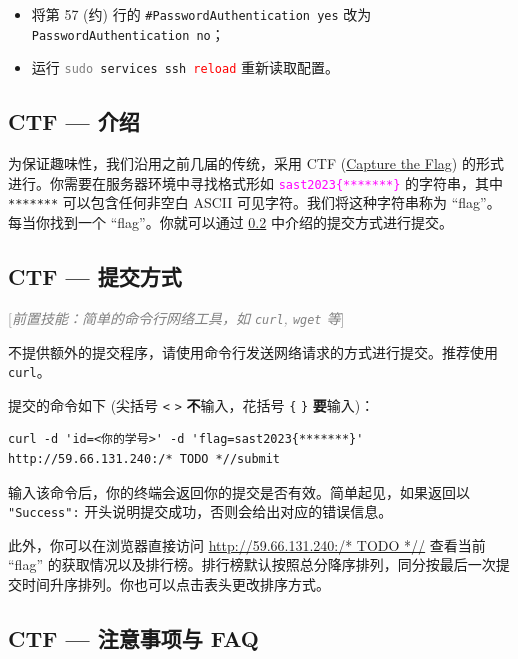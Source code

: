 \documentclass{article}
\begin{document}
	\begin{itemize}
		\itemsep0pt
		\item 将第 57 (约) 行的 \verb!#PasswordAuthentication yes! 改为 \texttt{PasswordAuthentication no}；
		\item 运行 \texttt{\textcolor{gray}{sudo} services ssh \textcolor{red}{reload}} 重新读取配置。
	\end{itemize}

	\subsection{CTF --- 介绍}

	为保证趣味性，我们沿用之前几届的传统，采用 CTF (\href{https://en.wikipedia.org/wiki/Capture_the_flag_(cybersecurity)}{Capture the Flag}) 的形式进行。你需要在服务器环境中寻找格式形如 \textcolor{fuchsia}{\texttt{sast2023\{*******\}}} 的字符串，其中 \texttt{*******} 可以包含任何非空白 ASCII 可见字符。我们将这种字符串称为 ``flag''。每当你找到一个 ``flag''。你就可以通过 \ref{sss:ctfsubmit} 中介绍的提交方式进行提交。\cite{sast2022-linux}

	\subsection{CTF --- 提交方式}
	\label{sss:ctfsubmit}

	\textcolor{gray}{[\textit{前置技能：简单的命令行网络工具，如 \texttt{curl}, \texttt{wget} 等}]}

	不提供额外的提交程序，请使用命令行发送网络请求的方式进行提交。推荐使用 \texttt{curl}。

	提交的命令如下 (尖括号 \texttt< \texttt> \textbf{不}输入，花括号 \texttt\{ \texttt\} \textbf{要}输入)：

	\begin{verbatim}
curl -d 'id=<你的学号>' -d 'flag=sast2023{*******}' http://59.66.131.240:/* TODO *//submit
	\end{verbatim}

	输入该命令后，你的终端会返回你的提交是否有效。简单起见，如果返回以 \texttt{"Success":} 开头说明提交成功，否则会给出对应的错误信息。

	此外，你可以在浏览器直接访问 \url{http://59.66.131.240:/* TODO *//} 查看当前 ``flag'' 的获取情况以及排行榜。排行榜默认按照总分降序排列，同分按最后一次提交时间升序排列。你也可以点击表头更改排序方式。

	\subsection{CTF --- 注意事项与 FAQ}
\end{document}
